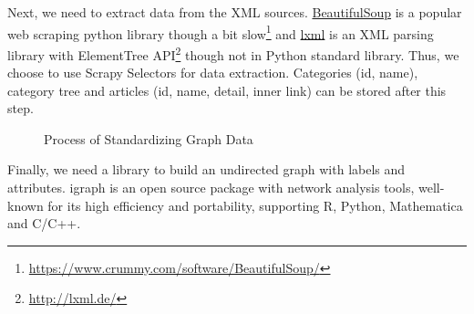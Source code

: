\noindent Next, we need to extract data from the XML sources. \href{https://www.crummy.com/software/BeautifulSoup/}{BeautifulSoup} is a popular web scraping python library though a bit slow\footnote{\href{https://www.crummy.com/software/BeautifulSoup/}{https://www.crummy.com/software/BeautifulSoup/}} and \href{http://lxml.de/}{lxml} is an XML parsing library with ElementTree API\footnote{\href{http://lxml.de/}{http://lxml.de/}} though not in Python standard library. Thus, we choose to use Scrapy Selectors for data extraction. Categories (id, name), category tree and articles (id, name, detail, inner link) can be stored after this step.\\
\begin{figure*}[!tbp]
	\centering
	\def\svgwidth{0.95\columnwidth}
	
	\caption{Process of Standardizing Graph Data}
	\label{fig:section2-pic1}
	\vspace{-25pt}
\end{figure*}
\vspace{-45pt}
Finally, we need a library to build an undirected graph with labels and attributes. igraph is an open source package with network analysis tools, well-known for its high efficiency and portability, supporting R, Python, Mathematica and C/C++.

